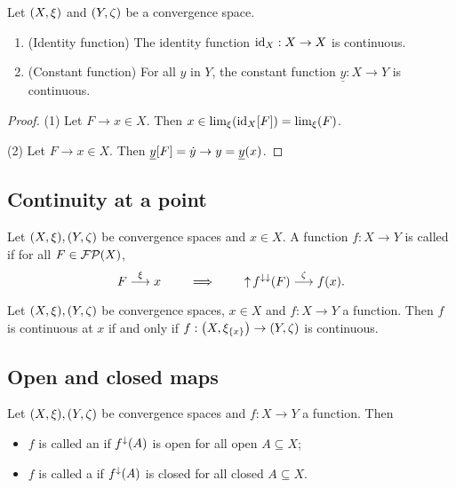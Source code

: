 \begin{lemma} \label{continuityConstructions}
Let $\sSet{X,\xi}$ and $\sSet{Y,\zeta}$ be a convergence space.
\begin{enumerate}
\item \textup{(Identity function)} The identity function $\operatorname{id}_X:X\to X$ is continuous.
\item \textup{(Constant function)} For all $y$ in $Y$, the constant function $\underline{y}: X \to Y$ is continuous.
\end{enumerate}
\end{lemma}
\begin{proof}
(1) Let $F\to x \in X$. Then $x\in \lim_\xi(\operatorname{id}_X[F]) = \lim_\xi(F)$.

(2) Let $F\to x \in X$. Then $\underline{y}[F] = \dot{y} \to y = \underline{y}(x)$.
\end{proof}

\subsection{Continuity at a point}
\begin{definition}
Let $\sSet{X,\xi}, \sSet{Y,\zeta}$ be convergence spaces and $x\in X$. A function $f:X\to Y$ is called  if for all $F\in \operatorname{\mathcal{FP}}(X)$,
\[ F\overset{\xi}{\longrightarrow} x \qquad\implies\qquad \operatorname{\uparrow} f^{\downarrow\downarrow}(F) \overset{\zeta}{\longrightarrow} f(x). \]
\end{definition}

\begin{lemma} \label{continuityAtPointConvergenceLemma}
Let $\sSet{X,\xi}, \sSet{Y,\zeta}$ be convergence spaces, $x\in X$ and $f: X\to Y$ a function. Then $f$ is continuous at $x$ \textup{if and only if} $f: \sSet{X,\xi_{\{x\}}}\to \sSet{Y,\zeta}$ is continuous.
\end{lemma}

\subsection{Open and closed maps}
\begin{definition}
Let $\sSet{X, \xi}, \sSet{Y, \zeta}$ be convergence spaces and $f: X\to Y$ a function. Then
\begin{itemize}
\item $f$ is called an  if $f^\downarrow(A)$ is open for all open $A\subseteq X$;
\item $f$ is called a  if $f^\downarrow(A)$ is closed for all closed $A\subseteq X$.
\end{itemize}
\end{definition}


